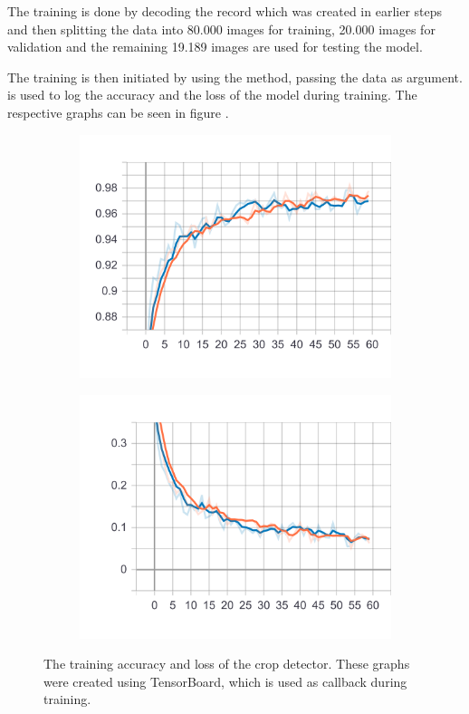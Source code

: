 The training is done by decoding the record which was created in earlier steps
and then splitting the data into 80.000 images for training, 20.000 images for validation and the remaining 19.189 images are used for testing the model.

The training is then initiated by using the  method, passing the data as argument.
is used to log the accuracy and the loss of the model during training. The respective graphs can be seen in figure \cite{fig:crop_detector_tensorboard}.

\begin{figure}
    \centering
    \begin{subfigure}[b]{0.45\textwidth}
        \includegraphics[width=\textwidth]{images/crop_detector_epoch_acc.png}
    \end{subfigure}
    \begin{subfigure}[b]{0.45\textwidth}
        \includegraphics[width=\textwidth]{images/crop_detector_epoch_loss.png}
    \end{subfigure}
    \caption[TensorBoard output for the crop detector]{The training accuracy and loss of the crop detector. These graphs were created using TensorBoard, which is used as callback during training.}
    \label{fig:crop_detector_tensorboard}
\end{figure}

